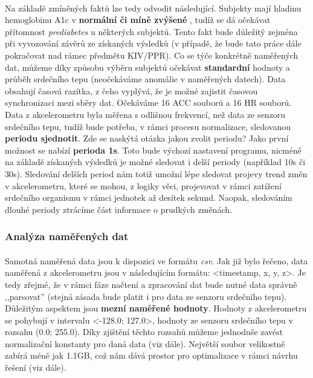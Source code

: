 \documentclass[12pt, a4paper]{article}
\begin{document}
\paragraph{} Na základě zmíněných faktů lze tedy odvodit následující. Subjekty mají hladinu hemoglobinu A1c v \textbf{normální či míně zvýšené} \cite{Hemoglobin}, tudíž se dá očekávat přítomnost \textit{prediabetes} u některých subjektů.
Tento fakt bude důležitý zejména při vyvozování závěrů ze získaných výsledků (v případě, že bude tato práce dále pokračovat nad rámec předmětu KIV/PPR).
Co se týče konkrétně naměřených dat, můžeme díky způsobu výběru subjektů očekávat \textbf{standardní} hodnoty a průběh srdečního tepu (neočekáváme anomálie v naměřených datech).
Data obsahují časová razítka, z čeho vyplývá, že je možné zajistit časovou synchronizaci mezi sběry dat.
Očekáváme 16 ACC souborů a 16 HR souborů.
Data z akcelerometru byla měřena s odlišnou frekvencí, než data ze senzoru srdečního tepu, tudíž bude potřeba, v rámci procesu normalizace, sledovanou \textbf{periodu sjednotit}. 
Zde se naskýtá otázka jakou zvolit periodu? 
Jako první možnost se nabízí \textbf{perioda 1s}.
Toto bude výchozí nastavení programu, nicméně na základě získaných výsledků je možné sledovat i delší periody (například 10s či 30s).
Sledování delších period nám totiž umožní lépe sledovat projevy trend změn v akcelerometru, které se mohou, z logiky věci, projevovat v rámci zatížení srdečního organismu v rámci jednotek až desítek sekund. 
Naopak, sledováním dlouhé periody ztrácíme část informace o prudkých změnách. 

\newpage
\subsubsection{Analýza naměřených dat}
\label{chapter-data-analysis}
\paragraph{} Samotná naměřená data jsou k dispozici ve formátu \textit{csv}.
Jak již bylo řečeno, data naměřená z akcelerometru jsou v následujícím formátu: <timestamp, x, y, z>.
Je tedy zřejmé, že v rámci fáze načtení a zpracování dat bude nutné data správně ,,parsovat'' (stejná zásada bude platit i pro data ze senzoru srdečního tepu).
Důležitým aspektem jsou \textbf{mezní naměřené hodnoty}. 
Hodnoty z akcelerometru se pohybují v intervalu <-128.0; 127.0>, hodnoty ze senzoru srdečního tepu v rozsahu (0.0; 255.0).
Díky zjištění těchto rozsahů můžeme jednoduše zavést normalizační konstanty pro daná data (viz dále).
Největší soubor velikostně zabírá méně jak 1.1GB, což nám dává prostor pro optimalizace v rámci návrhu řešení (viz dále).
\end{document}
